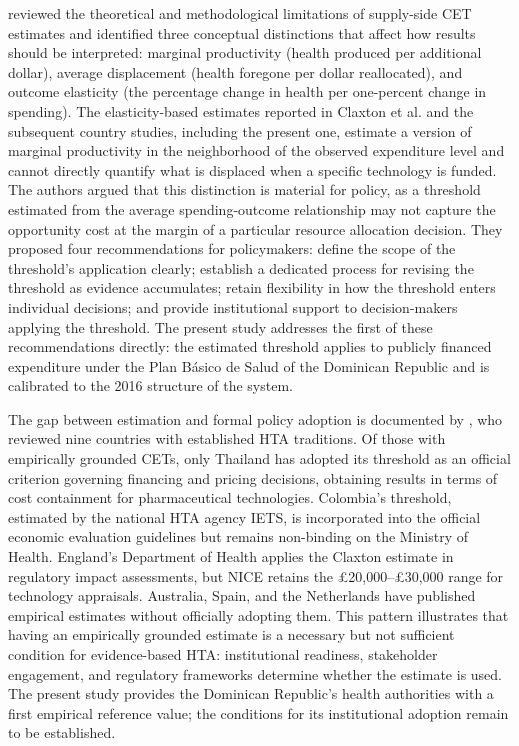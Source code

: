 \documentclass[11pt]{article}
\numberwithin{equation}{section}
\theoremstyle{remark}
\begin{document}
\citet{Sampson2022} reviewed the theoretical and methodological limitations of supply-side CET estimates and identified three conceptual distinctions that affect how results should be interpreted: marginal productivity (health produced per additional dollar), average displacement (health foregone per dollar reallocated), and outcome elasticity (the percentage change in health per one-percent change in spending). The elasticity-based estimates reported in Claxton et al. and the subsequent country studies, including the present one, estimate a version of marginal productivity in the neighborhood of the observed expenditure level and cannot directly quantify what is displaced when a specific technology is funded. The authors argued that this distinction is material for policy, as a threshold estimated from the average spending-outcome relationship may not capture the opportunity cost at the margin of a particular resource allocation decision. They proposed four recommendations for policymakers: define the scope of the threshold's application clearly; establish a dedicated process for revising the threshold as evidence accumulates; retain flexibility in how the threshold enters individual decisions; and provide institutional support to decision-makers applying the threshold. The present study addresses the first of these recommendations directly: the estimated threshold applies to publicly financed expenditure under the Plan Básico de Salud of the Dominican Republic and is calibrated to the 2016 structure of the system.

The gap between estimation and formal policy adoption is documented by \citet{Espinosa2024}, who reviewed nine countries with established HTA traditions. Of those with empirically grounded CETs, only Thailand has adopted its threshold as an official criterion governing financing and pricing decisions, obtaining results in terms of cost containment for pharmaceutical technologies. Colombia's threshold, estimated by the national HTA agency IETS, is incorporated into the official economic evaluation guidelines but remains non-binding on the Ministry of Health. England's Department of Health applies the Claxton estimate in regulatory impact assessments, but NICE retains the \pounds20,000--\pounds30,000 range for technology appraisals. Australia, Spain, and the Netherlands have published empirical estimates without officially adopting them. This pattern illustrates that having an empirically grounded estimate is a necessary but not sufficient condition for evidence-based HTA: institutional readiness, stakeholder engagement, and regulatory frameworks determine whether the estimate is used. The present study provides the Dominican Republic's health authorities with a first empirical reference value; the conditions for its institutional adoption remain to be established.
\end{document}

